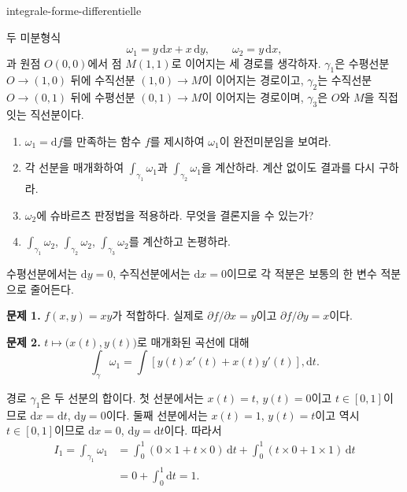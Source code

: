 
\begin{exo}{integrale-forme-differentielle}

두 미분형식
\[
\omega_1 = y\,\mathrm{d}x + x\,\mathrm{d}y,
\qquad
\omega_2 = y\,\mathrm{d}x,
\]
과 원점 $O(0,0)$에서 점 $M(1,1)$로 이어지는 세 경로를 생각하자.
$\gamma_1$은 수평선분 $O\to(1,0)$ 뒤에 수직선분 $(1,0)\to M$이 이어지는 경로이고,
$\gamma_2$는 수직선분 $O\to(0,1)$ 뒤에 수평선분 $(0,1)\to M$이 이어지는 경로이며,
$\gamma_3$은 $O$와 $M$을 직접 잇는 직선분이다.

\begin{enumerate}
\item $\omega_1 = \mathrm{d}f$를 만족하는 함수 $f$를 제시하여 $\omega_1$이 완전미분임을 보여라.
\item 각 선분을 매개화하여 $\int_{\gamma_1}\omega_1$과 $\int_{\gamma_2}\omega_1$을 계산하라. 계산 없이도 결과를 다시 구하라.
\item $\omega_2$에 슈바르츠 판정법을 적용하라. 무엇을 결론지을 수 있는가?
\item $\int_{\gamma_1}\omega_2$, $\int_{\gamma_2}\omega_2$, $\int_{\gamma_3}\omega_2$를 계산하고 논평하라.
\end{enumerate}

\begin{indication}
수평선분에서는 $\mathrm{d}y = 0$, 수직선분에서는 $\mathrm{d}x = 0$이므로
각 적분은 보통의 한 변수 적분으로 줄어든다.
\end{indication}

\begin{solution}
\textbf{문제 1.} $f(x,y) = xy$가 적합하다. 실제로 $\partial f/\partial x = y$이고 $\partial f/\partial y = x$이다.

\textbf{문제 2.} $t\mapsto\bigl(x(t),y(t)\bigr)$로 매개화된 곡선에 대해
\[
\int_\gamma\omega_1
= \int \left[y(t)x'(t)+x(t)y'(t)\right],\mathrm{d}t.
\]

경로 $\gamma_1$은 두 선분의 합이다. 첫 선분에서는 $x(t)=t$, $y(t)=0$이고
$t\in[0,1]$이므로 $\mathrm{d}x=\mathrm{d}t$, $\mathrm{d}y=0$이다.
둘째 선분에서는 $x(t)=1$, $y(t)=t$이고 역시 $t\in[0,1]$이므로
$\mathrm{d}x=0$, $\mathrm{d}y=\mathrm{d}t$이다. 따라서
\[
\begin{aligned}
I_1
= \int_{\gamma_1}\omega_1
&= \int_0^1\left(0\times 1+t\times 0\right)\,\mathrm{d}t
 + \int_0^1\left(t\times 0+1\times 1\right)\,\mathrm{d}t \\
&= 0+\int_0^1\mathrm{d}t = 1.
\end{aligned}
\]


\end{solution}
\end{exo}
